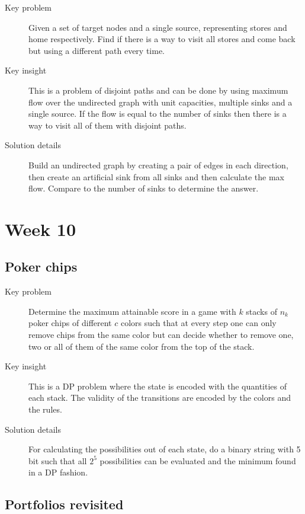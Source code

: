 \documentclass[11pt]{book}
\begin{document}
\begin{description}
	\item[Key problem] Given a set of target nodes and a single source, representing stores and home respectively. Find if there is a way to visit all stores and come back but using a different path every time.
	\item[Key insight] This is a problem of disjoint paths and can be done by using maximum flow over the undirected graph with unit capacities, multiple sinks and a single source. If the flow is equal to the number of sinks then there is a way to visit all of them with disjoint paths.
	\item[Solution details] Build an undirected graph by creating a pair of edges in each direction, then create an artificial sink from all sinks and then calculate the max flow. Compare to the number of sinks to determine the answer.
\end{description}

\section{Week 10}

\subsection{Poker chips}

\begin{description}
	\item[Key problem] Determine the maximum attainable score in a game with $k$ stacks of $n_k$ poker chips of different $c$ colors such that at every step one can only remove chips from the same color but can decide whether to remove one, two or all of them of the same color from the top of the stack.
	\item[Key insight] This is a DP problem where the state is encoded with the quantities of each stack. The validity of the transitions are encoded by the colors and the rules.
	\item[Solution details] For calculating the possibilities out of each state, do a binary string with 5 bit such that all $2^5$ possibilities can be evaluated and the minimum found in a DP fashion.
\end{description}

\subsection{Portfolios revisited}
\end{document}
